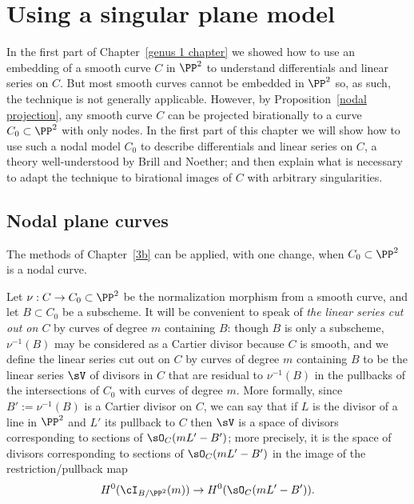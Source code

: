 

\def\adj{{\mathfrak F}}
\chapter{Using a singular plane model}
\label{PlaneCurvesChapter}
\label{PlaneCurveChapter}

In the first part of Chapter~\ref{genus 1 chapter} we showed how to use an embedding of a smooth curve $C$
in $\PP^2$ to understand differentials and linear series on $C$. But most smooth curves cannot be embedded in
$\PP^2$ so, as such, the technique is not generally applicable. However, by Proposition~\ref{nodal projection},
 any smooth curve $C$ can be projected 
birationally to a curve $C_0\subset\PP^2$ with only nodes. In the first part of this chapter we will show
how to use such a nodal model $C_0$ to describe differentials and linear series on $C$, a theory well-understood
by Brill and Noether;  and then explain
what is necessary to adapt the technique to birational images of $C$ with arbitrary singularities.

\section{Nodal plane curves}\label{nodal curves section}

The methods of Chapter~\ref{3b}
 can be applied, with one change, when $C_{0}\subset \PP^{2}$
is a nodal curve. 

Let $\nu: C\to C_{0}\subset \PP^{2}$ be the normalization morphism from a smooth curve,
and let $B\subset C_{0}$ be a subscheme.
It will be convenient to speak of \emph{the linear series cut out on $C$} by curves of degree $m$
containing $B$: though $B$ is only a subscheme, $\nu^{-1}(B)$ may be considered as a Cartier divisor because
$C$ is smooth, and we define
the linear series cut out on $C$ by curves of degree $m$
containing $B$ to be
the linear series  $\sV$ of divisors in $C$ that are residual to $\nu^{-1}(B)$ in the pullbacks 
of the intersections of $C_{0}$ with curves of degree $m$. More formally, since $B' := \nu^{-1}(B)$
is a Cartier divisor on $C$, we can say that if $L$ is the divisor of a line in $\PP^{2}$ and $L'$
its pullback to $C$ then
$\sV$ is a space of divisors corresponding to
sections of $\sO_{C}(mL'-B')$; more precisely, it is the space of divisors corresponding to
sections of $\sO_{C}(mL'-B')$ in the image of the restriction/pullback map
$$
H^0(\cI_{B/\PP^2}(m)) \to H^0(\sO_{C}(mL'-B')).
$$

